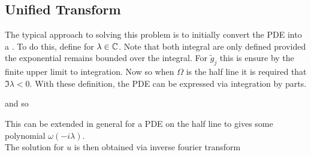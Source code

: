 \documentclass{article}
\begin{document}
\subsection{Unified Transform}
The typical approach to solving this problem is to initially convert the PDE into a . To do this, define
for $\lambda \in \mathbb{C}$. Note that both integral are only defined provided the exponential remains bounded over the integral. For $\tilde{g}_j$ this is ensure by the finite upper limit to integration. Now 
so when $\Omega$ is the half line it is required that $\Im \lambda < 0$. With these definition, the PDE can be expressed via integration by parts. 

\begin{example}
and so 
\end{example}
This can be extended in general for a PDE on the half line
to 
gives some polynomial $\omega(-i\lambda)$. \\
The solution for $u$ is then obtained via inverse fourier transform 
\end{document}
